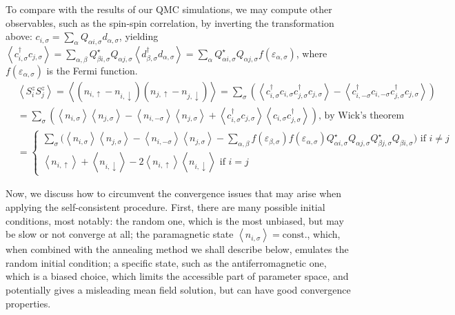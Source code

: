To compare with the results of our \ac{QMC} simulations, we may compute other observables, such as the spin-spin correlation, by inverting the transformation above: $c_{i, \sigma} = \sum_{\alpha} Q_{\alpha i, \sigma} d_{\alpha, \sigma}$, yielding $\left\langle c_{i,\sigma}^\dagger c_{j,\sigma} \right\rangle = \sum_{\alpha, \beta} Q_{\beta i, \sigma}^\star Q_{\alpha j, \sigma} \left\langle d_{\beta,\sigma}^\dagger d_{\alpha,\sigma} \right\rangle = \sum_\alpha Q_{\alpha i, \sigma}^\star Q_{\alpha j, \sigma} f ( \varepsilon_{\alpha, \sigma} ) $, where $f (\varepsilon_{\alpha, \sigma})$ is the Fermi function.
\begin{equation}
\begin{split}
&\left\langle S_i^z S_j^z \right\rangle = \left\langle ( n_{i,\uparrow} -  n_{i,\downarrow} ) ( n_{j,\uparrow} -  n_{j,\downarrow} )  \right\rangle = \sum_{\sigma} \left( \left\langle c_{i,\sigma}^\dagger c_{i,\sigma} c_{j,\sigma}^\dagger c_{j,\sigma} \right\rangle - \left\langle c_{i,-\sigma}^\dagger c_{i,-\sigma} c_{j,\sigma}^\dagger c_{j,\sigma} \right\rangle \right) \\
&=\sum_{\sigma} \left( \left\langle n_{i,\sigma} \right\rangle \left\langle n_{j,\sigma} \right\rangle - \left\langle n_{i,-\sigma} \right\rangle \left\langle n_{j,\sigma} \right\rangle + \left\langle c_{i,\sigma}^\dagger c_{j,\sigma}  \right\rangle \left\langle c_{i,\sigma} c_{j,\sigma}^\dagger \right\rangle \right) , \, \text{by Wick's theorem} \\
&=
\begin{cases}
\sum_{\sigma} \big( \left\langle n_{i,\sigma} \right\rangle \left\langle n_{j,\sigma} \right\rangle - \left\langle n_{i,-\sigma} \right\rangle \left\langle n_{j,\sigma} \right\rangle - \sum_{\alpha, \beta}  f ( \varepsilon_{\beta, \sigma} )  f ( \varepsilon_{\alpha, \sigma} ) Q_{\alpha i, \sigma}^\star Q_{\alpha j, 
\sigma}  Q_{\beta j, \sigma}^\star Q_{\beta i, 
\sigma} \big) \,\, \text{if} \,\, i \neq j \\
\left\langle n_{i, \uparrow} \right\rangle +  \left\langle n_{i, \downarrow } \right\rangle - 2 \left\langle n_{i, \uparrow} \right\rangle \left\langle n_{i, \downarrow } \right\rangle  \,\,\text{if} \,\, i = j
\end{cases}
\end{split}
\end{equation}

Now, we discuss how to circumvent the convergence issues that may arise when applying the self-consistent procedure.
First, there are many possible initial conditions, most notably: the random one, which is the most unbiased, but may be slow or not converge at all; the paramagnetic state $\left\langle n_{i,\sigma} \right\rangle = \text{const.}$, which, when combined with the annealing method we shall describe below, emulates the random initial condition; a specific state, such as the antiferromagnetic one, which is a biased choice, which limits the accessible part of parameter space, and potentially gives a misleading mean field solution, but can have good convergence properties.

